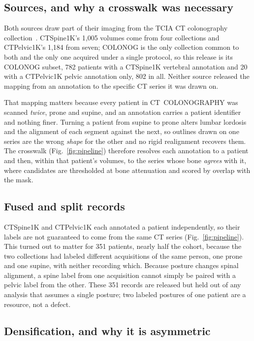 \documentclass[aapm,mph,amsmath,amssymb,reprint]{revtex4-2}
\begin{document}
\subsection{Sources, and why a crosswalk was necessary}\label{sec:sources}

Both sources draw part of their imaging from the TCIA CT colonography
collection~\cite{colonog,tcia}. CTSpine1K's 1{,}005 volumes come from four
collections and CTPelvic1K's 1{,}184 from seven; COLONOG is the only collection common to
both and the only one acquired under a single protocol, so this release is its COLONOG subset, 782 patients with a CTSpine1K vertebral annotation and 20 with a CTPelvic1K pelvic
annotation only, 802 in all. Neither source released the mapping from an annotation to the
specific CT series it was drawn on.

That mapping matters because every patient in CT~COLONOGRAPHY was scanned \emph{twice},
prone and supine, and an annotation carries a patient identifier and nothing finer. Turning
a patient from supine to prone alters lumbar lordosis and the alignment of each segment
against the next, so outlines drawn on one series are the wrong \emph{shape} for the other
and no rigid realignment recovers them. The crosswalk (Fig.~\ref{fig:pipeline}) therefore
resolves each annotation to a patient and then, within that patient's volumes, to the series
whose bone \emph{agrees} with it, where candidates are thresholded at bone attenuation and scored
by overlap with the mask.

\subsection{Fused and split records}

CTSpine1K and CTPelvic1K each annotated a patient independently, so their labels are not guaranteed to come from the same CT series (Fig.~\ref{fig:pipeline}). This turned out to matter for 351 patients, nearly half the cohort, because the two collections had labeled different acquisitions of the same person, one prone and one supine, with neither recording which. Because posture changes spinal alignment, a spine label from one acquisition cannot simply be paired with a pelvic label from the other. These 351 records are released but held out of any analysis that assumes a single posture; two labeled postures of one patient are a resource, not a defect. 

\subsection{Densification, and why it is asymmetric}
\end{document}

